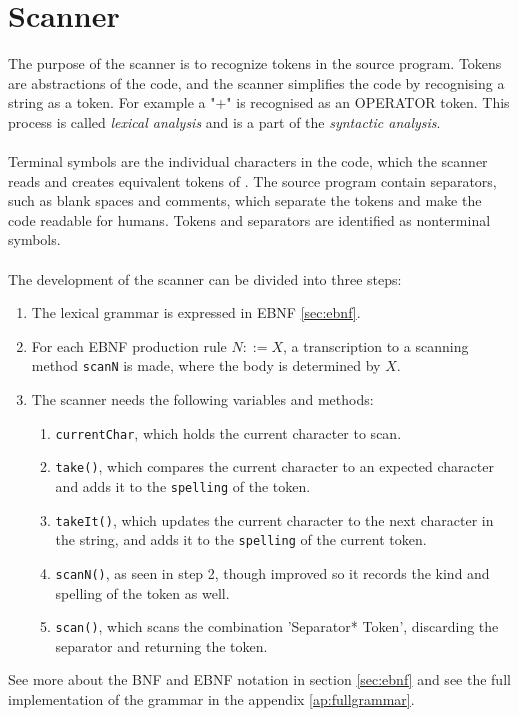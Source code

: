 \section{Scanner}
\label{sec:scannertheory}
The purpose of the scanner is to recognize tokens in the source program. Tokens are abstractions of the code, and the scanner simplifies the code by recognising a string as a token. For example a "+" is recognised as an OPERATOR token. This process is called \textit{lexical analysis} and is a part of the \textit{syntactic analysis}.
\\
\\
Terminal symbols are the individual characters in the code, which the scanner reads and creates equivalent tokens of \cite{misc:spo}. The source program contain separators, such as blank spaces and comments, which separate the tokens and make the code readable for humans. Tokens and separators are identified as nonterminal symbols.
\\
\\
The development of the scanner can be divided into three steps:
\begin{enumerate}
\item The lexical grammar is expressed in EBNF \ref{sec:ebnf}.
\item For each EBNF production rule $N::=X$, a transcription to a scanning method \texttt{scanN} is made, where the body is determined by $X$.
\item The scanner needs the following variables and methods: 
\begin{enumerate}
\item \texttt{currentChar}, which holds the current character to scan.
\item \texttt{take()}, which compares the current character to an expected character and adds it to the \texttt{spelling} of the token.
\item \texttt{takeIt()}, which updates the current character to the next character in the string, and adds it to the \texttt{spelling} of the current token.
\item \texttt{scanN()}, as seen in step 2, though improved so it records the kind and spelling of the token as well.
\item \texttt{scan()}, which scans the combination 'Separator* Token', discarding the separator and returning the token.
\end{enumerate}
\end{enumerate}

See more about the BNF and EBNF notation in section \ref{sec:ebnf} and see the full implementation of the grammar in the appendix \ref{ap:fullgrammar}.